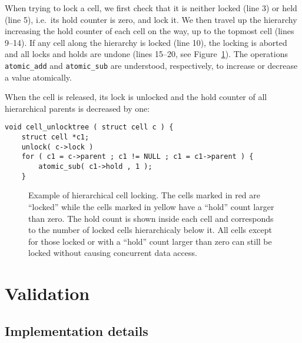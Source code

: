 \documentclass[final]{siamltex}
\newcommand{\fig}[1]
    {Figure~\ref{fig:#1}}
\begin{document}
\noindent When trying to lock a cell, we first check that it is neither
locked (line 3) or held (line 5), i.e.~its hold counter is zero, and lock it.
We then travel up the hierarchy increasing the 
hold counter of each cell on the way, up to the topmost cell (lines 9--14).
If any cell along the hierarchy is locked (line 10), the locking is aborted
and all locks and holds are undone (lines 15--20, see \fig{CellLocking}).
The operations {\tt atomic\_add} and {\tt atomic\_sub} are understood,
respectively, to increase or decrease a value atomically.

When the cell is released, its lock is unlocked and the hold
counter of all hierarchical parents is decreased by one:

\begin{center}\begin{minipage}{0.8\textwidth}
    \begin{lstlisting}
void cell_unlocktree ( struct cell c ) {
    struct cell *c1;
    unlock( c->lock )
    for ( c1 = c->parent ; c1 != NULL ; c1 = c1->parent ) {
        atomic_sub( c1->hold , 1 );
    }
    \end{lstlisting}
\end{minipage}\end{center}


\begin{figure}[ht]
    \centerline{}
    
    \caption{Example of hierarchical cell locking. The cells marked in red
        are ``locked'' while the cells marked in yellow have a ``hold'' count
        larger than zero.
        The hold count is shown inside each cell and corresponds to the number
        of locked cells hierarchicaly below it.
        All cells except for those locked or with a ``hold'' count larger than
        zero can still be locked without causing concurrent data access.
        }
    \label{fig:CellLocking}
\end{figure}


\section{Validation}

\subsection{Implementation details}
\end{document}
